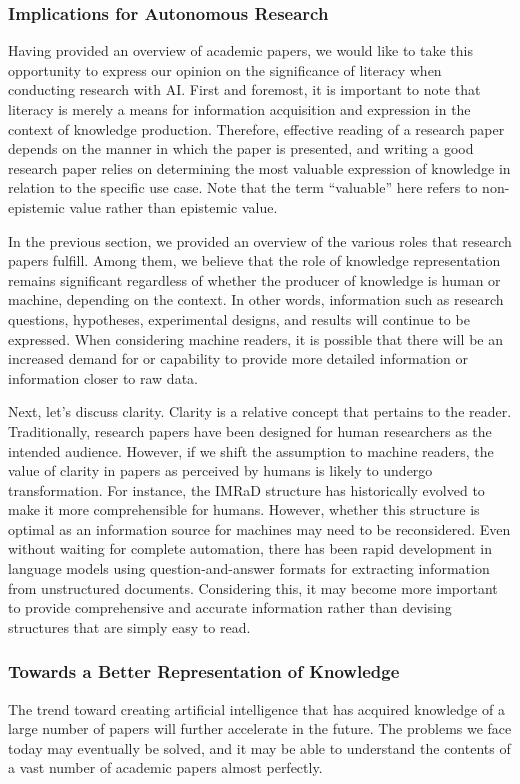 \subsubsection{Implications for Autonomous Research}
Having provided an overview of academic papers, we would like to take this opportunity to express our opinion on the significance of literacy when conducting research with AI. First and foremost, it is important to note that literacy is merely a means for information acquisition and expression in the context of knowledge production. Therefore, effective reading of a research paper depends on the manner in which the paper is presented, and writing a good research paper relies on determining the most valuable expression of knowledge in relation to the specific use case. Note that the term ``valuable'' here refers to non-epistemic value rather than epistemic value.

In the previous section, we provided an overview of the various roles that research papers fulfill. Among them, we believe that the role of knowledge representation remains significant regardless of whether the producer of knowledge is human or machine, depending on the context. In other words, information such as research questions, hypotheses, experimental designs, and results will continue to be expressed. When considering machine readers, it is possible that there will be an increased demand for or capability to provide more detailed information or information closer to raw data.

Next, let's discuss clarity. Clarity is a relative concept that pertains to the reader. Traditionally, research papers have been designed for human researchers as the intended audience. However, if we shift the assumption to machine readers, the value of clarity in papers as perceived by humans is likely to undergo transformation. For instance, the IMRaD structure has historically evolved to make it more comprehensible for humans. However, whether this structure is optimal as an information source for machines may need to be reconsidered. Even without waiting for complete automation, there has been rapid development in language models using question-and-answer formats for extracting information from unstructured documents. Considering this, it may become more important to provide comprehensive and accurate information rather than devising structures that are simply easy to read.

\subsubsection{Towards a Better Representation of Knowledge}
The trend toward creating artificial intelligence that has acquired knowledge of a large number of papers will further accelerate in the future. The problems we face today may eventually be solved, and it may be able to understand the contents of a vast number of academic papers almost perfectly. 

